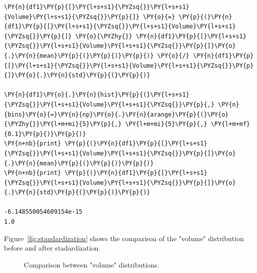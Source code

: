 \begin{tcolorbox}[breakable, size=fbox, boxrule=1pt, pad at break*=1mm,colback=cellbackground, colframe=cellborder]
\begin{Verbatim}[commandchars=\\\{\}]
\PY{n}{df1}\PY{p}{[}\PY{l+s+s1}{\PYZsq{}}\PY{l+s+s1}{Volume}\PY{l+s+s1}{\PYZsq{}}\PY{p}{]} \PY{o}{=} \PY{p}{(}\PY{n}{df1}\PY{p}{[}\PY{l+s+s1}{\PYZsq{}}\PY{l+s+s1}{Volume}\PY{l+s+s1}{\PYZsq{}}\PY{p}{]} \PY{o}{\PYZhy{}} \PY{n}{df1}\PY{p}{[}\PY{l+s+s1}{\PYZsq{}}\PY{l+s+s1}{Volume}\PY{l+s+s1}{\PYZsq{}}\PY{p}{]}\PY{o}{.}\PY{n}{mean}\PY{p}{(}\PY{p}{)}\PY{p}{)} \PY{o}{/} \PY{n}{df1}\PY{p}{[}\PY{l+s+s1}{\PYZsq{}}\PY{l+s+s1}{Volume}\PY{l+s+s1}{\PYZsq{}}\PY{p}{]}\PY{o}{.}\PY{n}{std}\PY{p}{(}\PY{p}{)}

\PY{n}{df1}\PY{o}{.}\PY{n}{hist}\PY{p}{(}\PY{l+s+s1}{\PYZsq{}}\PY{l+s+s1}{Volume}\PY{l+s+s1}{\PYZsq{}}\PY{p}{,} \PY{n}{bins}\PY{o}{=}\PY{n}{np}\PY{o}{.}\PY{n}{arange}\PY{p}{(}\PY{o}{\PYZhy{}}\PY{l+m+mi}{5}\PY{p}{,} \PY{l+m+mi}{5}\PY{p}{,} \PY{l+m+mf}{0.1}\PY{p}{)}\PY{p}{)}
\PY{n+nb}{print} \PY{p}{(}\PY{n}{df1}\PY{p}{[}\PY{l+s+s1}{\PYZsq{}}\PY{l+s+s1}{Volume}\PY{l+s+s1}{\PYZsq{}}\PY{p}{]}\PY{o}{.}\PY{n}{mean}\PY{p}{(}\PY{p}{)}\PY{p}{)}
\PY{n+nb}{print} \PY{p}{(}\PY{n}{df1}\PY{p}{[}\PY{l+s+s1}{\PYZsq{}}\PY{l+s+s1}{Volume}\PY{l+s+s1}{\PYZsq{}}\PY{p}{]}\PY{o}{.}\PY{n}{std}\PY{p}{(}\PY{p}{)}\PY{p}{)}

-6.148550054609154e-15
1.0
\end{Verbatim}
\end{tcolorbox}

Figure~\ref{fig:standardization} shows the comparison of the "volume" distribution before and after stadardization.

\begin{figure}[htb]
	\centering
	\caption{Comparison between "volume" distributions.}
	\label{fig:dummy2}
\end{figure}

